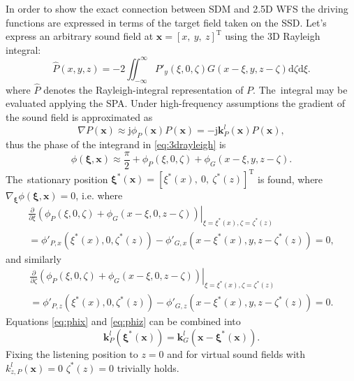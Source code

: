 \documentclass[12pt,a4paper]{article}
\newcommand{\td}{\mathrm{d}}
\newcommand{\ti}{\mathrm{j}}
\newcommand{\vx}{\mathbf{x}}
\newcommand{\vxi}{\bm{\xi}}
\newcommand{\vk}{\mathbf{k}}
\begin{document}
In order to show the exact connection between SDM and 2.5D WFS the driving functions are expressed in terms of the target field taken on the SSD.
Let's express an arbitrary sound field at $\vx = [x,\ y,\ z]^{\mathrm{T}}$ using the 3D Rayleigh integral:
%
\begin{equation}
\hat{P}(x,y,z) = -2 \iint_{-\infty}^{\infty} P'_y(\xi,0,\zeta) G(x-\xi,y,z-\zeta) \td \zeta \td \xi.
\label{eq:3drayleigh}
\end{equation}
%
where $\hat{P}$ denotes the Rayleigh-integral representation of $P$.
The~integral may be evaluated applying the SPA.
Under high-frequency assumptions the gradient of the sound field is approximated as
\begin{equation}
\nabla P(\vx) \approx \ti \phi_P(\vx) P(\vx) = -\ti \vk_P^l(\vx) P(\vx),
\end{equation}
%
thus the phase of the integrand in \eqref{eq:3drayleigh} is
%
\begin{equation}
\phi(\vxi,\vx) \approx \frac{\pi}{2} + \phi_P(\xi,0,\zeta) + \phi_G(x-\xi,y,z-\zeta).
\label{eq:Rayleigh_phase}
\end{equation}
%
The~stationary position
$\vxi^*(\vx) = [\xi^*(x),\ 0,\ \zeta^*(z)]^{\mathrm{T}}$
is found, where
$\nabla_{\vxi} \phi(\vxi,\vx) = 0$,
i.e. where
\begin{eqnarray}
\left.
\frac{\partial}{\partial \xi} \left( \phi_P(\xi,0,\zeta) + \phi_G(x-\xi,0,z-\zeta) \right)\right|_{\xi = \xi^*(x), \zeta = \zeta^*(z)} \nonumber \\
=
\phi'_{P,x}(\xi^*(x),0,\zeta^*(z)) - \phi'_{G,x}(x-\xi^*(x),y,z-\zeta^*(z)) = 0,
\label{eq:phix}
\end{eqnarray}
%
and similarly
%
\begin{eqnarray}
\left. \frac{\partial}{\partial \zeta} \left( \phi_P(\xi,0,\zeta) + \phi_G(x-\xi,0,z-\zeta) \right)\right|_{\xi = \xi^*(x), \zeta = \zeta^*(z)} \nonumber \\
=
\phi'_{P,z}(\xi^*(x),0,\zeta^*(z)) - \phi'_{G,z}(x-\xi^*(x),y,z-\zeta^*(z)) = 0.
\label{eq:phiz}
\end{eqnarray}
%
Equations \eqref{eq:phix} and \eqref{eq:phiz} can be combined into
%
\begin{equation}
\vk^l_P(\vxi^*(\vx)) = \vk^l_G(\vx - \vxi^*(\vx)).
\label{eq:rayleigh_stat_point}
\end{equation}
%
Fixing the listening position to $z=0$ and for virtual sound fields with $k^l_{z,P}(\vx) = 0$ $\zeta^*(z) = 0$ trivially holds.
\end{document}

